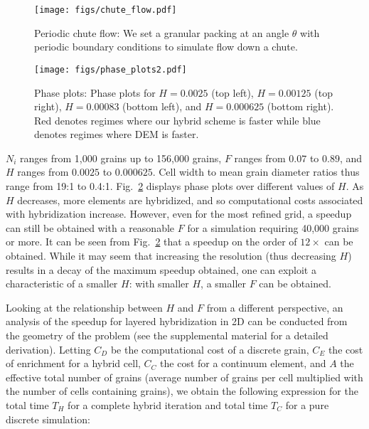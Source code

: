 \begin{figure}
  \centering
  \texttt{[image: figs/chute\_flow.pdf]}
  \caption{
    Periodic chute flow: We set a granular packing at an angle $\theta$ with periodic boundary conditions to simulate flow down a chute.
  }
  \label{fig:hybrid:chute_flow}
\end{figure}

\begin{figure}
  \centering
  \texttt{[image: figs/phase\_plots2.pdf]}
  \caption{
    Phase plots: Phase plots for $H = 0.0025$ (top left), $H = 0.00125$ (top right), $H = 0.00083$ (bottom left), and $H = 0.000625$ (bottom right). Red denotes
    regimes where our hybrid scheme is faster while blue denotes regimes where DEM is faster.
  }
  \label{fig:hybrid:phase_plots}
\end{figure}

$N_i$ ranges from 1,000 grains up to 156,000 grains, $F$ ranges from $0.07$ to $0.89$, and $H$ ranges from $0.0025$ to $0.000625$. Cell width to mean grain diameter ratios thus range from 19:1 to 0.4:1.
Fig.~\ref{fig:hybrid:phase_plots} displays phase plots over different values of $H$. As $H$ decreases, more elements are hybridized, and so computational costs associated
with hybridization increase. However, even for the most refined grid, a speedup can still be obtained with a reasonable $F$ for a simulation requiring 40,000 grains or more.
It can be seen from Fig.~\ref{fig:hybrid:phase_plots} that a speedup on the order of $12\times$ can be obtained. While it may seem that increasing the resolution (thus decreasing $H$)
results in a decay of the maximum speedup obtained, one can exploit a characteristic of a smaller $H$: with smaller $H$, a smaller $F$ can be obtained.

Looking at the relationship between $H$ and $F$ from a different perspective, an analysis of the speedup for layered hybridization in 2D can be conducted from the geometry of the problem (see the supplemental material for a detailed derivation). Letting $C_D$ be the computational cost
of a discrete grain, $C_E$ the cost of enrichment for a hybrid cell, $C_C$ the cost for a continuum element, and $A$ the effective total number of grains (average number of grains per 
cell multiplied with the number of cells containing grains), we obtain the following expression for the total time $T_H$ for a complete hybrid iteration and total time $T_C$ for a pure discrete simulation:

